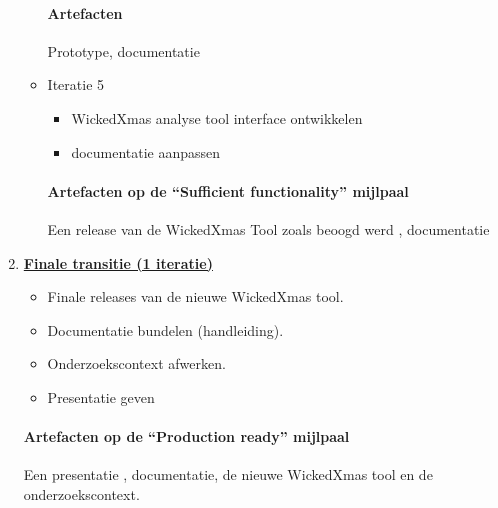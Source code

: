 \begin{enumerate}
\begin{itemize}
		\paragraph{Artefacten}
		Prototype, documentatie
	\item Iteratie 5
		\begin{itemize}
		\item WickedXmas analyse tool interface ontwikkelen
		\item documentatie aanpassen
		\end{itemize}
		\paragraph{Artefacten op de ``Sufficient functionality'' mijlpaal }
		 Een release van de WickedXmas Tool zoals beoogd werd , documentatie
	\end{itemize}
		
\item \underline{\textbf{Finale transitie (1 iteratie)}}
	\begin{itemize}
		\item Finale releases van de nieuwe WickedXmas tool.
		\item Documentatie bundelen (handleiding).
		\item Onderzoekscontext afwerken.
		\item Presentatie geven
	\end{itemize}
	\paragraph{Artefacten op de ``Production ready'' mijlpaal}
	Een presentatie , documentatie, de nieuwe WickedXmas tool en de onderzoekscontext.

\end{enumerate}